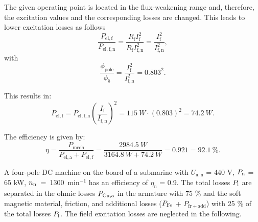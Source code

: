 \begin{solutionblock}
	The given operating point is located in the flux-weakening range and, therefore, the excitation values and the corresponding losses are changed.
	This leads to lower excitation losses as follows
	\begin{equation}
		\frac{P_{\mathrm{el,f}}}{P_{\mathrm{el,f,n}}}
		= \frac{R_{\mathrm{f}} I^2_{\mathrm{f}}}{R_{\mathrm{f}} I^2_{\mathrm{f,n}}}
		= \frac{I^2_{\mathrm{f}}}{I^2_{\mathrm{f,n}}},
	\end{equation}
	with
	\begin{equation}
		\frac{\phi_{\mathrm{pole}}}{\phi_{\updelta}}
		= \frac{I^2_{\mathrm{f}}}{I^2_{\mathrm{f,n}}}
		= 0.803^2.
	\end{equation}

	This results in:
	\begin{equation}
		P_{\mathrm{el,f}} = P_{\mathrm{el,f,n}} \left( \frac{I_{\mathrm{f}}}{I_{\mathrm{f,n}}} \right)^2
		= 115 \ \si{W} \cdot \left(0.803 \right)^2
		= 74.2 \ \si{W}.
	\end{equation}

	The efficiency is given by:
	\begin{equation}
		\eta = \frac{P_{\mathrm{mech}}}{P_{\mathrm{el,a}} + P_{\mathrm{el,f}}}
		= \frac{2984.5 \ \si{W}}{3164.8 \ \si{W} + 74.2 \ \si{W}}
		= 0.921 = 92.1 \ \%.
	\end{equation}

\end{solutionblock}


A four-pole DC machine on the board of a submarine with $U_{\mathrm{a,n}}$ = 440 V, $P_{\mathrm{n}}$ = 65 kW, $n_{\mathrm{n}}$~=~1300~$\mathrm{min^{-1}}$ has an efficiency of $\eta_{\mathrm{n}}$ = 0.9. The total losses $P_{\mathrm{l}}$ are separated in the ohmic losses $P_{\mathrm{Cu,a}}$ in the armature with 75 \% and the soft magnetic material, friction, and additional losses ($P_{\mathrm{Fe}}$ + $P_{\mathrm{fr+add}}$) with 25 \% of the total losses $P_{\mathrm{l}}$. The field excitation losses are neglected in the following.


